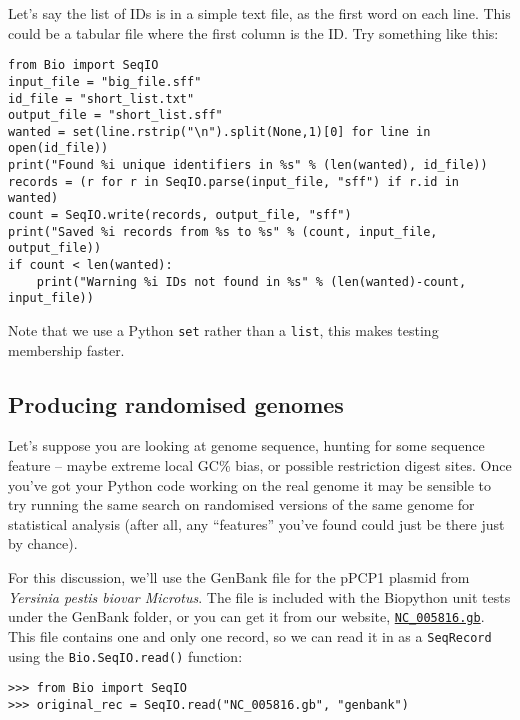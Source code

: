 \documentclass{report}
\begin{document}
Let's say the list of IDs is in a simple text file, as the first word on
each line. This could be a tabular file where the first column is the ID.
Try something like this:

\begin{verbatim}
from Bio import SeqIO
input_file = "big_file.sff"
id_file = "short_list.txt"
output_file = "short_list.sff"
wanted = set(line.rstrip("\n").split(None,1)[0] for line in open(id_file))
print("Found %i unique identifiers in %s" % (len(wanted), id_file))
records = (r for r in SeqIO.parse(input_file, "sff") if r.id in wanted)
count = SeqIO.write(records, output_file, "sff")
print("Saved %i records from %s to %s" % (count, input_file, output_file))
if count < len(wanted):
    print("Warning %i IDs not found in %s" % (len(wanted)-count, input_file))
\end{verbatim}

Note that we use a Python \verb|set| rather than a \verb|list|, this makes
testing membership faster.

\subsection{Producing randomised genomes}

Let's suppose you are looking at genome sequence, hunting for some sequence
feature -- maybe extreme local GC\% bias, or possible restriction digest sites.
Once you've got your Python code working on the real genome it may be sensible
to try running the same search on randomised versions of the same genome for
statistical analysis (after all, any ``features'' you've found could just be
there just by chance).

For this discussion, we'll use the GenBank file for the pPCP1 plasmid from
\textit{Yersinia pestis biovar Microtus}.  The file is included with the
Biopython unit tests under the GenBank folder, or you can get it from our
website, \href{http://biopython.org/SRC/biopython/Tests/GenBank/NC_005816.gb}
{\texttt{NC\_005816.gb}}.  
This file contains one and only one record, so we can read it in as a
\verb|SeqRecord| using the \verb|Bio.SeqIO.read()| function:

\begin{verbatim}
>>> from Bio import SeqIO
>>> original_rec = SeqIO.read("NC_005816.gb", "genbank")
\end{verbatim}
\end{document}
